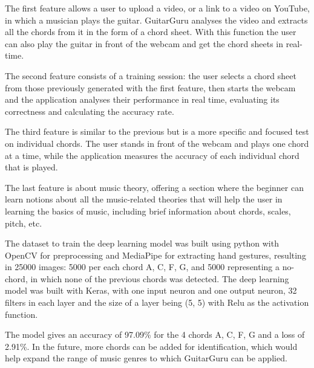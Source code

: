 The first feature allows a user to upload a video, or a link to a video on YouTube,
in which a musician plays the guitar.
GuitarGuru analyses the video and extracts all the chords from it in the form of a chord sheet.
With this function the user can also play the guitar in front of the webcam and get the chord sheets in real-time.

The second feature consists of a training session: the user selects a chord sheet from those previously
generated with the first feature, then starts the webcam and the application analyses their performance in real time,
evaluating its correctness and calculating the accuracy rate.

The third feature is similar to the previous but is a more specific and focused test on individual chords.
The user stands in front of the webcam and plays one chord at a time,
while the application measures the accuracy of each individual chord that is played.

The last feature is about music theory, offering a section where the beginner can learn notions about all the
music-related theories that will help the user in learning the basics of music,
including brief information about chords, scales, pitch, etc.

The dataset to train the deep learning model was built using python with OpenCV for preprocessing and MediaPipe for
extracting hand gestures, resulting in 25000 images: 5000 per each chord A, C, F, G, and 5000 representing a no-chord,
in which none of the previous chords was detected.
The deep learning model was built with Keras, with one input neuron and one output neuron,
32 filters in each layer and the size of a layer being (5, 5) with Relu as the activation function.

The model gives an accuracy of 97.09\% for the 4 chords A, C, F, G and a loss of 2.91\%.
In the future, more chords can be added for identification,
which would help expand the range of music genres to which GuitarGuru can be applied.

